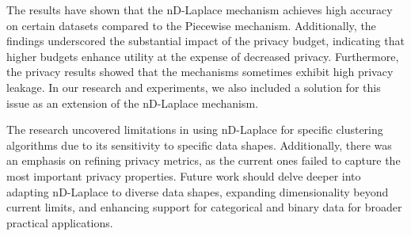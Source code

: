 The results have shown that the nD-Laplace mechanism achieves high accuracy on certain datasets compared to the Piecewise mechanism. 
Additionally, the findings underscored the substantial impact of the privacy budget, indicating that higher budgets enhance utility at the expense of decreased privacy. 
Furthermore, the privacy results showed that the mechanisms sometimes exhibit high privacy leakage. 
In our research and experiments, we also included a solution for this issue as an extension of the nD-Laplace mechanism. \newline

The research uncovered limitations in using nD-Laplace for specific clustering algorithms due to its sensitivity to specific data shapes. Additionally, there was an emphasis on refining privacy metrics, as the current ones failed to capture the most important privacy properties. Future work should delve deeper into adapting nD-Laplace to diverse data shapes, expanding dimensionality beyond current limits, and enhancing support for categorical and binary data for broader practical applications.


